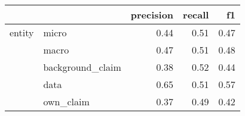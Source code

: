 \begin{tabular}{llrrr}
\toprule
       &           &  precision &  recall &   f1 \\
\midrule
entity & micro &       0.44 &    0.51 & 0.47 \\
       & macro &       0.47 &    0.51 & 0.48 \\
       & background\_claim &       0.38 &    0.52 & 0.44 \\
       & data &       0.65 &    0.51 & 0.57 \\
       & own\_claim &       0.37 &    0.49 & 0.42 \\
\bottomrule
\end{tabular}
